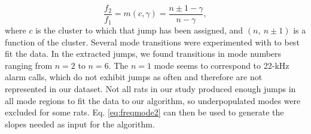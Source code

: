 \documentclass[superscriptaddress, twocolumn, prl]{revtex4}
\begin{document}
\begin{equation}
\label{eq:freqmode2}
\frac{f_{2}}{f_{1}}=m(c,\gamma)=\frac{n\pm1-\gamma}{n-\gamma},
\end{equation}where $c$ is the cluster to which that jump has been assigned, and $\left(n,\: n\pm1\right)$ is a function of the cluster. Several mode transitions were experimented with to best fit the data. In the extracted jumps, we found transitions in mode numbers ranging from $n=2$ to $n=6$. The $n=1$ mode seems to correspond to 22-kHz alarm calls, which do not exhibit jumps as often and therefore are not represented in our dataset. Not all rats in our study produced enough jumps in all mode regions to fit the data to our algorithm, so underpopulated modes were excluded for some rats. Eq. \ref{eq:freqmode2} can then be used to generate the slopes needed as input for the algorithm.
\end{document}
